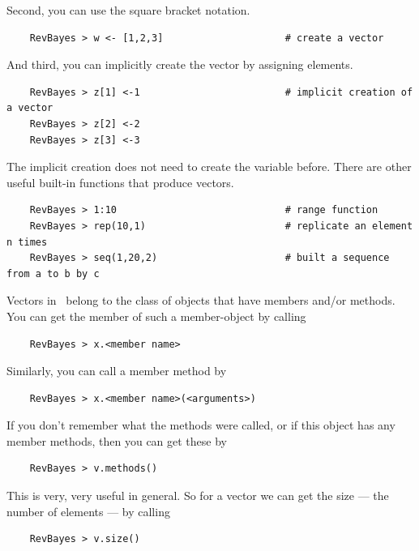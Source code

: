 \documentclass[11pt]{article}
\begin{document}
Second, you can use the square bracket notation.
{\tt \begin{snugshade*}
\begin{lstlisting}    
    RevBayes > w <- [1,2,3]                     # create a vector
\end{lstlisting}
\end{snugshade*}}
And third, you can implicitly create the vector by assigning elements.
{\tt \begin{snugshade*}
\begin{lstlisting}    
    RevBayes > z[1] <-1                         # implicit creation of a vector
    RevBayes > z[2] <-2                   
    RevBayes > z[3] <-3                  
\end{lstlisting}
\end{snugshade*}} 
The implicit creation does not need to create the variable before.
There are other useful built-in functions that produce vectors.
{\tt \begin{snugshade*}
\begin{lstlisting}    
    RevBayes > 1:10                             # range function
    RevBayes > rep(10,1)                        # replicate an element n times
    RevBayes > seq(1,20,2)                      # built a sequence from a to b by c
\end{lstlisting}
\end{snugshade*}} 

Vectors in \Rev~belong to the class of objects that have members and/or methods.
You can get the member of such a member-object by calling
{\tt \begin{snugshade*}
\begin{lstlisting}    
    RevBayes > x.<member name>
\end{lstlisting}
\end{snugshade*}} 
Similarly, you can call a member method by
{\tt \begin{snugshade*}
\begin{lstlisting}    
    RevBayes > x.<member name>(<arguments>)                 
\end{lstlisting}
\end{snugshade*}} 
If you don't remember what the methods were called, or if this object has any member methods, then you can get these by
{\tt \begin{snugshade*}
\begin{lstlisting}    
    RevBayes > v.methods()                 
\end{lstlisting}
\end{snugshade*}} 
This is very, very useful in general.
So for a vector we can get the size --- the number of elements --- by calling
{\tt \begin{snugshade*}
\begin{lstlisting}    
    RevBayes > v.size()                 
\end{lstlisting}
\end{snugshade*}} 
\end{document}
